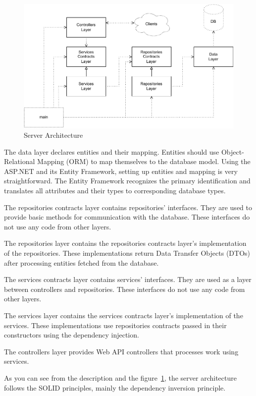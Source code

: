 \begin{figure}
    \centering
    \includegraphics[width=1\linewidth]{assets/design/serverarchitecture.pdf}
    \caption{Server Architecture}
    \label{fig:design:serverarchitecture}
\end{figure}

The data layer declares entities and their mapping.
Entities should use Object-Relational Mapping (ORM) to map themselves to the database model.
Using the ASP.NET and its Entity Framework, setting up entities and mapping is very straightforward.
The Entity Framework recognizes the primary identification and translates all attributes and their types to corresponding database types.

The repositories contracts layer contains repositories' interfaces.
They are used to provide basic methods for communication with the database.
These interfaces do not use any code from other layers.

The repositories layer contains the repositories contracts layer's implementation of the repositories.
These implementations return Data Transfer Objects (DTOs) after processing entities fetched from the database.

The services contracts layer contains services' interfaces.
They are used as a layer between controllers and repositories.
These interfaces do not use any code from other layers.

The services layer contains the services contracts layer's implementation of the services.
These implementations use repositories contracts passed in their constructors using the dependency injection.

The controllers layer provides Web API controllers that processes work using services.

As you can see from the description and the figure~\ref{fig:design:serverarchitecture}, the server architecture follows the SOLID principles, mainly the dependency inversion principle.

